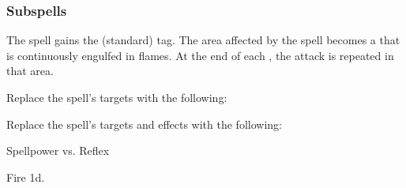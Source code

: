 \subsubsection{Subspells}



The spell gains the  (standard) tag.
The area affected by the spell becomes a  that is continuously engulfed in flames.
At the end of each , the attack is repeated in that area.









Replace the spell's targets with the following:
\begin{spellcontent}

\begin{augmenttargetinginfo}




\end{augmenttargetinginfo}

\end{spellcontent}








Replace the spell's targets and effects with the following:
\begin{spellcontent}

\begin{augmenttargetinginfo}




\end{augmenttargetinginfo}


\begin{augmenteffects}




\begin{spellattack}{Spellpower vs. Reflex}


\hit Fire  \plus1d.


\end{spellattack}



\end{augmenteffects}

\end{spellcontent}





